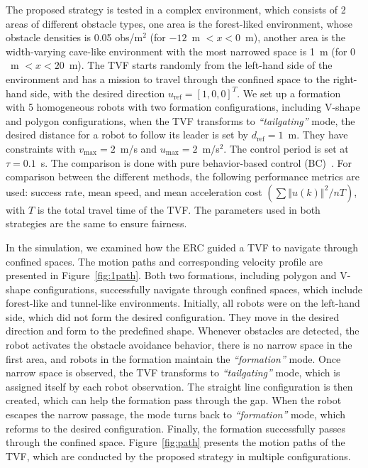 The proposed strategy is tested in a complex environment, which consists of 2 areas of different obstacle types, one area is the forest-liked environment, whose obstacle densities is 0.05 obs/m$^2$ (for $-12$~m $<x<0$~m), another area is the width-varying cave-like environment with the most narrowed space is 1~m (for $0$~m $<x<20$~m). The TVF starts randomly from the left-hand side of the environment and has a mission to travel through the confined space to the right-hand side, with the desired direction $u_\text{ref}=\left[1,0,0\right]^T$. We set up a formation with 5 homogeneous robots with two formation configurations, including V-shape and polygon configurations, when the TVF transforms to \textit{``tailgating''} mode, the desired distance for a robot to follow its leader is set by $d_\text{ref}=1$~m. They have constraints with $v_\text{max}=2$~m/s and $u_\text{max}=2$~m/s$^2$. The control period is set at $\tau=0.1$~s. The comparison is done with pure behavior-based control (BC)~\cite{736776,Vsrhelyi2018}. For comparison between the different methods, the following performance metrics are used: success rate, mean speed, and mean acceleration cost $(\sum{\left\Vert u(k)\right\Vert^2}/{nT})$, with $T$ is the total travel time of the TVF. The parameters used in both strategies are the same to ensure fairness.

In the simulation, we examined how the ERC guided a TVF to navigate through confined spaces. The motion paths and corresponding velocity profile are presented in Figure~\ref{fig:1path}. Both two formations, including polygon and V-shape configurations, successfully navigate through confined spaces, which include forest-like and tunnel-like environments. Initially, all robots were on the left-hand side, which did not form the desired configuration. They move in the desired direction and form to the predefined shape. Whenever obstacles are detected, the robot activates the obstacle avoidance behavior, there is no narrow space in the first area, and robots in the formation maintain the \textit{``formation''} mode. Once narrow space is observed, the TVF transforms to \textit{``tailgating''} mode, which is assigned itself by each robot observation. The straight line configuration is then created, which can help the formation pass through the gap. When the robot escapes the narrow passage, the mode turns back to \textit{``formation''} mode, which reforms to the desired configuration. Finally, the formation successfully passes through the confined space. Figure~\ref{fig:path} presents the motion paths of the TVF, which are conducted by the proposed strategy in multiple configurations.

